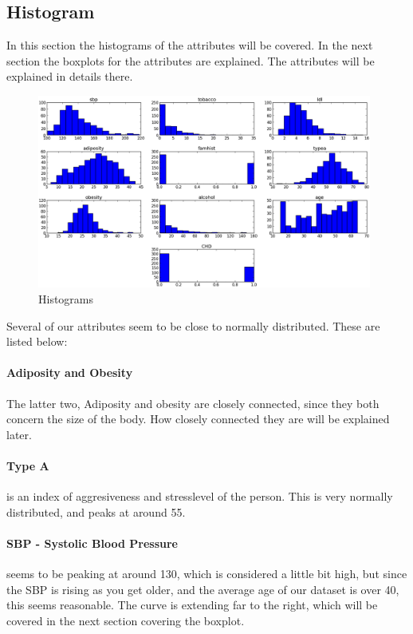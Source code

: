\subsection{Histogram}
In this section the histograms of the attributes will be covered. In the next section the boxplots for the attributes are explained. The attributes will be explained in details there.
\begin{figure}[H]
\centering
\includegraphics[width=11cm, keepaspectratio=true]{pictures/histogram.png}
\vspace{-0.2cm}
\caption{\footnotesize Histograms}
\vspace{-0.5cm}
\label{histogram}
\end{figure}
Several of our attributes seem to be close to normally distributed. These are listed below:
\paragraph{Adiposity and Obesity}
The latter two, Adiposity and obesity are closely connected, since they both concern the size of the body. How closely connected they are will be explained later.

\paragraph{Type A} is an index of aggresiveness and stresslevel of the person. This is very normally distributed, and peaks at around 55.

\paragraph{SBP - Systolic Blood Pressure} 	seems to be peaking at around 130, which is considered a little bit high, but since the SBP is rising as you get older, and the average age of our dataset is over 40, this seems reasonable. The curve is extending far to the right, which will be covered in the next section covering the boxplot.

